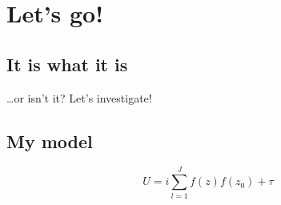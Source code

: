 

\Clear
\chapter{Let's go!}

\section{It is what it is}
\dots or isn't it? Let's investigate!

\begin{subappendices}
	
\section{My model}
\label{sub:my_model}

%
\begin{equation}
	U = i \sum_{l=1}^{J} f(z)f(z_0) + \tau
\end{equation}
%

\end{subappendices}

